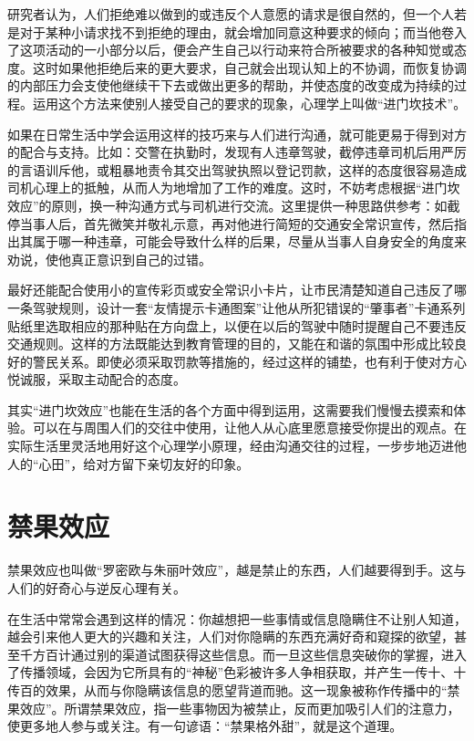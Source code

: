 \documentclass[11pt]{ctexart}
\begin{document}
研究者认为，人们拒绝难以做到的或违反个人意愿的请求是很自然的，但一个人若是对于某种小请求找不到拒绝的理由，就会增加同意这种要求的倾向；而当他卷入了这项活动的一小部分以后，便会产生自己以行动来符合所被要求的各种知觉或态度。这时如果他拒绝后来的更大要求，自己就会出现认知上的不协调，而恢复协调的内部压力会支使他继续干下去或做出更多的帮助，并使态度的改变成为持续的过程。运用这个方法来使别人接受自己的要求的现象，心理学上叫做“进门坎技术”。

如果在日常生活中学会运用这样的技巧来与人们进行沟通，就可能更易于得到对方的配合与支持。比如：交警在执勤时，发现有人违章驾驶，截停违章司机后用严厉的言语训斥他，或粗暴地责令其交出驾驶执照以登记罚款，这样的态度很容易造成司机心理上的抵触，从而人为地增加了工作的难度。这时，不妨考虑根据“进门坎效应”的原则，换一种沟通方式与司机进行交流。这里提供一种思路供参考：如截停当事人后，首先微笑并敬礼示意，再对他进行简短的交通安全常识宣传，然后指出其属于哪一种违章，可能会导致什么样的后果，尽量从当事人自身安全的角度来劝说，使他真正意识到自己的过错。

最好还能配合使用小的宣传彩页或安全常识小卡片，让市民清楚知道自己违反了哪一条驾驶规则，设计一套“友情提示卡通图案”让他从所犯错误的“肇事者”卡通系列贴纸里选取相应的那种贴在方向盘上，以便在以后的驾驶中随时提醒自己不要违反交通规则。这样的方法既能达到教育管理的目的，又能在和谐的氛围中形成比较良好的警民关系。即使必须采取罚款等措施的，经过这样的铺垫，也有利于使对方心悦诚服，采取主动配合的态度。

其实“进门坎效应”也能在生活的各个方面中得到运用，这需要我们慢慢去摸索和体验。可以在与周围人们的交往中使用，让他人从心底里愿意接受你提出的观点。在实际生活里灵活地用好这个心理学小原理，经由沟通交往的过程，一步步地迈进他人的“心田”，给对方留下亲切友好的印象。
\section{禁果效应}
\label{sec-54}


禁果效应也叫做“罗密欧与朱丽叶效应”，越是禁止的东西，人们越要得到手。这与人们的好奇心与逆反心理有关。

在生活中常常会遇到这样的情况：你越想把一些事情或信息隐瞒住不让别人知道，越会引来他人更大的兴趣和关注，人们对你隐瞒的东西充满好奇和窥探的欲望，甚至千方百计通过别的渠道试图获得这些信息。而一旦这些信息突破你的掌握，进入了传播领域，会因为它所具有的“神秘”色彩被许多人争相获取，并产生一传十、十传百的效果，从而与你隐瞒该信息的愿望背道而驰。这一现象被称作传播中的“禁果效应”。所谓禁果效应，指一些事物因为被禁止，反而更加吸引人们的注意力，使更多地人参与或关注。有一句谚语：“禁果格外甜”，就是这个道理。
\end{document}
